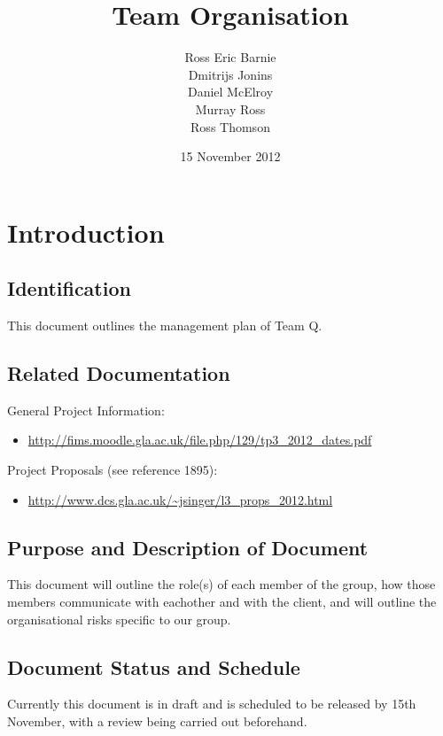 \documentclass{l3deliverable}
\title{Team Organisation}
\author{
  Ross Eric Barnie \\
  Dmitrijs Jonins \\
  Daniel McElroy \\
  Murray Ross \\
  Ross Thomson
}
\date{15 November 2012}
\begin{document}

\maketitle


\section{Introduction}

\subsection{Identification}

This document outlines the management plan of Team Q.

\subsection{Related Documentation}

General Project Information:
\begin{itemize}
\item{\url{http://fims.moodle.gla.ac.uk/file.php/129/tp3_2012_dates.pdf}}
\end{itemize}

Project Proposals (see reference 1895):
\begin{itemize}
\item{\url{http://www.dcs.gla.ac.uk/~jsinger/l3_props_2012.html}}
\end{itemize}

\subsection{Purpose and Description of Document}

This document will outline the role(s) of each member of the group, how those
members communicate with eachother and with the client, and will outline the
organisational risks specific to our group.

\subsection{Document Status and Schedule}

Currently this document is in draft and is scheduled to be released by 15th
November, with a review being carried out beforehand.
\end{document}
